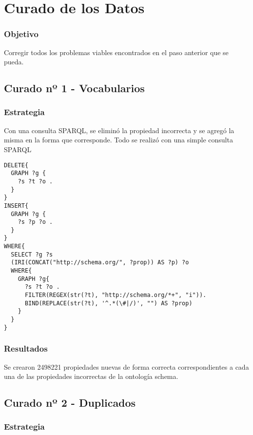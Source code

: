 \chapter{Curado de los Datos}
\label{chapter:curado}

\subsection*{Objetivo}
Corregir todos los problemas viables encontrados en el paso anterior que se pueda.

\section{Curado nº 1 - Vocabularios}
\label{section:curado-vocabularios}

\subsection*{Estrategia}
Con una consulta SPARQL, se eliminó la propiedad incorrecta y se agregó la misma en la forma que corresponde.
Todo se realizó con una simple consulta SPARQL
\begin{lstlisting}[frame=single]  
DELETE{
  GRAPH ?g {
    ?s ?t ?o .
  }
}
INSERT{
  GRAPH ?g {
    ?s ?p ?o .
  }
}
WHERE{
  SELECT ?g ?s 
  (IRI(CONCAT("http://schema.org/", ?prop)) AS ?p) ?o
  WHERE{
    GRAPH ?g{
      ?s ?t ?o .
      FILTER(REGEX(str(?t), "http://schema.org/*+", "i")).
      BIND(REPLACE(str(?t), '^.*(\#|/)', "") AS ?prop)
    }
  }
}
\end{lstlisting}


\subsection*{Resultados}
Se crearon 2498221 propiedades nuevas de forma correcta correspondientes a cada una de las propiedades incorrectas de la ontología 
schema.

\section{Curado nº 2 - Duplicados}
\label{section:curado-duplicados}

\subsection*{Estrategia}

